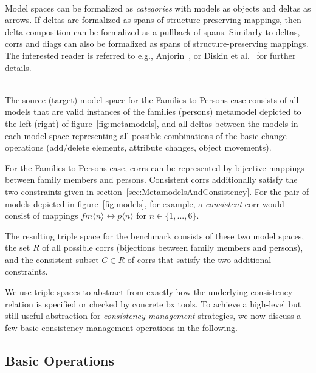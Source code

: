 \begin{remark}[Formalization]~\\
Model spaces can be formalized as \emph{categories} with models as objects and deltas as arrows.
If deltas are formalized as spans of structure-preserving mappings, then delta composition can be formalized as a pullback of spans.
Similarly to deltas, corrs and diags can also be formalized as spans of structure-preserving mappings.
The interested reader is referred to e.g., Anjorin~\cite{DBLP:conf/ac/Anjorin16}, or Diskin et al.~\cite{JOT:issue_2011_01/article6} for further details.
\end{remark}

\begin{example}~\\
The source (target) model space for the Families-to-Persons case consists of all models that are valid instances of the families (persons) metamodel depicted to the left (right) of figure~\ref{fig:metamodels}, and all deltas between the models in each model space representing all possible combinations of the basic change operations (add/delete elements, attribute changes, object movements).

For the Families-to-Persons case, corrs can be represented by bijective mappings between family members and persons.
Consistent corrs additionally satisfy the two constraints given in section~\ref{sec:MetamodelsAndConsistency}.  
For the pair of models depicted in figure~\ref{fig:models}, for example, a \emph{consistent} corr would consist of mappings $fm\langle n \rangle \leftrightarrow p\langle n \rangle$ for $n \in \{1, ..., 6 \}$.

The resulting triple space for the benchmark consists of these two model spaces, the set $R$ of all possible corrs (bijections between family members and persons), and the consistent subset $C \in R$ of corrs that satisfy the two additional constraints. 
\end{example}

We use triple spaces to abstract from exactly how the underlying consistency relation is specified or checked by concrete bx tools.
To achieve a high-level but still useful abstraction for \emph{consistency management} strategies, we now discuss a few basic consistency management operations in the following. 


\subsection{Basic Operations}
\label{sec:basicOperations}

